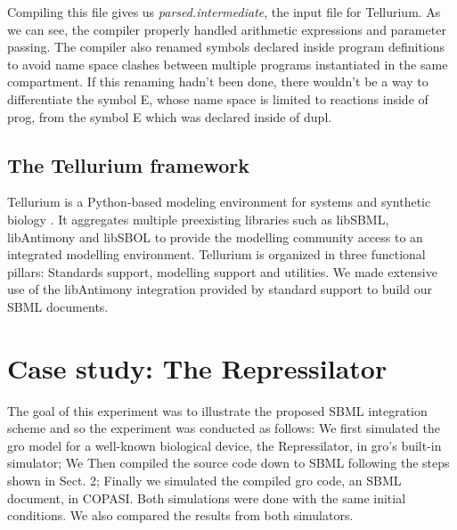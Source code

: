 \documentclass[12pt]{article}
\begin{document}

    
    
    Compiling this file gives us \textit{parsed.intermediate}, the input file for Tellurium. As we can see, the compiler properly handled arithmetic expressions and parameter passing. The compiler also renamed symbols declared inside program definitions to avoid name space clashes between multiple programs instantiated in the same compartment. If this renaming hadn't been done, there wouldn't be a way to differentiate the symbol E, whose name space is limited to reactions inside of prog, from the symbol E which was declared inside of dupl.
    
    
    
\subsection{The Tellurium framework}

    Tellurium is a Python-based modeling environment for systems and synthetic biology \cite{Choi2018}. It aggregates multiple preexisting libraries such as libSBML, libAntimony and libSBOL to provide the modelling community access to an integrated modelling environment. Tellurium is organized in three functional pillars: Standards support, modelling support and utilities. We made extensive use of the libAntimony integration provided by standard support to build our SBML documents.


\section{Case study: The Repressilator}


    The goal of this experiment was to illustrate the proposed SBML integration scheme and so the experiment was conducted as follows: We first simulated the gro model for a well-known biological device, the Repressilator, in gro's built-in simulator; We Then compiled the source code down to SBML following the steps shown in Sect. 2; Finally we simulated the compiled gro code, an SBML document, in COPASI. Both simulations were done with the same initial conditions. We also compared the results from both simulators.
\end{document}
